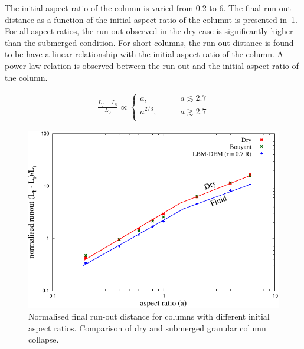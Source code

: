 The initial aspect ratio of the column is varied from 0.2 to 6. The final 
run-out distance as a function of the initial aspect ratio of the columnt is 
presented in~\cref{fig:runoutf}. For all aspect ratios, the run-out observed in 
the dry case is significantly higher than the submerged condition. For short 
columns, the run-out distance is found to be have a linear relationship with 
the initial aspect ratio of the column.  A power law 
relation is observed between the run-out and the initial aspect ratio of the 
column.

\begin{align}
\frac{L_{\textit{f}}-L_{\textit{0}}}{L_{\textit{0}}} \propto 
\begin{cases}
a, &\qquad \textit{a}\lesssim 2.7 \\
a^{2/3}, &\qquad \textit{a} \gtrsim 2.7 \\
\end{cases}
\end{align}

\begin{figure}[tbhp]
	\centering
	\includegraphics[width=\textwidth]{runoutf}
	\caption{Normalised final run-out distance for columns with different 
	initial aspect ratios. Comparison of dry and submerged granular column 
	collapse.}
	\label{fig:runoutf}
\end{figure}

